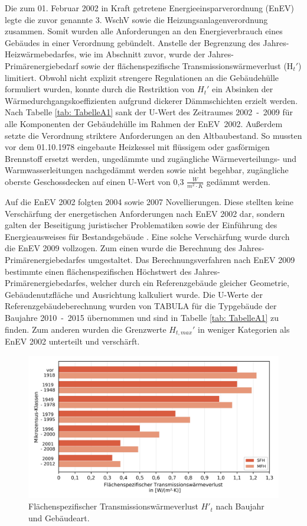 Die zum 01. Februar 2002 in Kraft getretene Energieeinsparverordnung (EnEV) legte die zuvor genannte 3. WschV sowie die Heizungsanlagenverordnung zusammen. 
Somit wurden alle Anforderungen an den Energieverbrauch eines Gebäudes in einer Verordnung gebündelt.
Anstelle der Begrenzung des Jahres-Heizwärmebedarfes, wie im Abschnitt zuvor, wurde der Jahres-Primärenergiebedarf sowie der flächenspezifische Transmissionswärmeverlust (H\(_t'\)) limitiert.
Obwohl nicht explizit strengere Regulationen an die Gebäudehülle formuliert wurden, konnte durch die Restriktion von \(H_t'\) ein Absinken der Wärmedurchgangskoeffizienten aufgrund dickerer Dämmschichten erzielt werden.
Nach Tabelle \ref{tab: TabelleA1} sank der U-Wert des Zeitraumes \mbox{2002 - 2009} für alle Komponenten der Gebäudehülle im Rahmen der \mbox{EnEV 2002}.
Außerdem setzte die Verordnung striktere Anforderungen an den Altbaubestand. 
So mussten vor dem 01.10.1978 eingebaute Heizkessel mit flüssigem oder gasförmigen Brennstoff ersetzt werden, ungedämmte und zugängliche Wärmeverteilungs- und Warmwasserleitungen nachgedämmt werden sowie nicht begehbar, zugängliche oberste Geschossdecken auf einen U-Wert von 0,3 \(\frac{W}{m^2 \cdot K} \) gedämmt werden.

Auf die EnEV 2002 folgten 2004 sowie 2007 Novellierungen.
Diese stellten keine Verschärfung der energetischen Anforderungen nach EnEV 2002 dar, sondern galten der Beseitigung juristischer Problematiken sowie der Einführung des Energieausweises für Bestandsgebäude \cite{Wild.2015}.
Eine solche Verschärfung wurde durch die EnEV 2009 vollzogen.
Zum einen wurde die Berechnung des Jahres-Primärenergiebedarfes umgestaltet.
Das Berechnungsverfahren nach EnEV 2009 bestimmte einen flächenspezifischen Höchstwert des Jahres-Primärenergiebedarfes, welcher durch ein Referenzgebäude gleicher Geometrie, Gebäudenutzfläche und Ausrichtung kalkuliert wurde.
Die U-Werte der Referenzgebäudeberechnung wurden von TABULA für die Typgebäude der Baujahre \mbox{2010 - 2015} übernommen und sind in Tabelle \ref{tab: TabelleA1} zu finden.
Zum anderen wurden die Grenzwerte \(H_{t, max}'\) in weniger Kategorien als EnEV 2002 unterteilt und verschärft.

\begin{figure}[H]
	\centering
		\includegraphics{Pictures/TransmissionswaermekoeffizientBaujahr.jpg}
	\caption{Flächenspezifischer Transmissionswärmeverlust \(H'_t\) nach Baujahr und Gebäudeart. \cite{Bigalke.2016}}
	\label{fig: Abbildung221} 
\end{figure}

